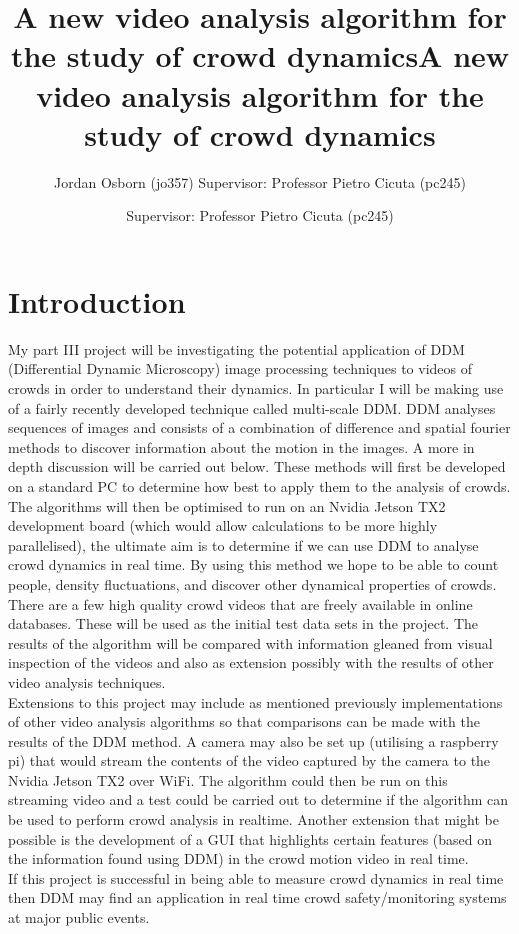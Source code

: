 \documentclass[11pt]{article}
\title{A new video analysis algorithm for the study of crowd dynamics}
\author{Jordan Osborn (jo357) Supervisor: Professor Pietro Cicuta (pc245)}
\begin{document}
\begin{titlingpage}
\maketitle
\end{titlingpage}
\clearpage

\title{A new video analysis algorithm for the study of crowd dynamics}
\author{Supervisor: Professor Pietro Cicuta (pc245)}
\maketitle

\section{Introduction}
My part III project will be investigating the potential application of DDM (Differential Dynamic Microscopy) image processing techniques to videos of crowds in order to understand their dynamics.
In particular I will be making use of a fairly recently developed technique called multi-scale DDM.
DDM analyses sequences of images and consists of a combination of difference and spatial fourier methods to discover information about the motion in the images.
A more in depth discussion will be carried out below.
These methods will first be developed on a standard PC to determine how best to apply them to the analysis of crowds.
The algorithms will then be optimised to run on an Nvidia Jetson TX2 development board (which would allow calculations to be more highly parallelised), the ultimate aim is to determine if we can use DDM to analyse crowd dynamics in real time.
By using this method we hope to be able to count people, density fluctuations, and discover other dynamical properties of crowds.
There are a few high quality crowd videos that are freely available in online databases.
These will be used as the initial test data sets in the project.
The results of the algorithm will be compared with information gleaned from visual inspection of the videos and also as extension possibly with the results of other video analysis techniques.
\\
Extensions to this project may include as mentioned previously implementations of other video analysis algorithms so that comparisons can be made with the results of the DDM method.
A camera may also be set up (utilising a raspberry pi) that would stream the contents of the video captured by the camera to the Nvidia Jetson TX2 over WiFi.
The algorithm could then be run on this streaming video and a test could be carried out to determine if the algorithm can be used to perform crowd analysis in realtime.
Another extension that might be possible is the development of a GUI that highlights certain features (based on the information found using DDM) in the crowd motion video in real time.
\\
If this project is successful in being able to measure crowd dynamics in real time then DDM may find an application in real time crowd safety/monitoring systems at major public events.
\end{document}
